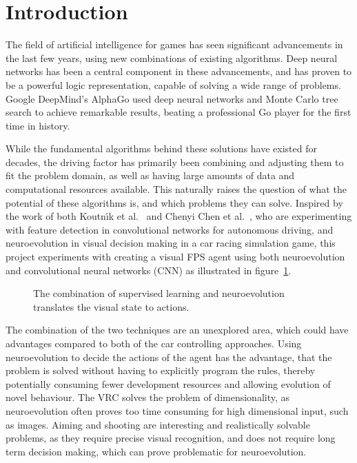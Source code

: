 
\section{Introduction}
The field of artificial intelligence for games has seen significant advancements in the last few years, using new combinations of existing algorithms. Deep neural networks has been a central component in these advancements, and has proven to be a powerful logic representation, capable of solving a wide range of problems. Google DeepMind's AlphaGo\cite{christian} used deep neural networks and Monte Carlo tree search to achieve remarkable results, beating a professional Go player for the first time in history.

While the fundamental algorithms behind these solutions have existed for decades, the driving factor has primarily been combining and adjusting them to fit the problem domain, as well as having large amounts of data and computational resources available. This naturally raises the question of what the potential of these algorithms is, and which problems they can solve. Inspired by the work of both Koutn\'{\i}k et al.~\cite{torcs} and Chenyi Chen et al.~\cite{chen}, who are experimenting with feature detection in convolutional networks for autonomous driving, and neuroevolution in visual decision making in a car racing simulation game, this project experiments with creating a visual FPS agent using both neuroevolution and convolutional neural networks (CNN) as illustrated in figure~\ref{fig:architecture}.

\begin{figure}[H]
	\begin{scriptsize}
		\sffamily
		\def\svgwidth{\textwidth}
		
		\vspace{-45mm}
	\end{scriptsize}
	\caption[Overview of the architecture of the solution]{The combination of supervised learning and neuroevolution translates the visual state to actions.}
	\label{fig:architecture}
\end{figure}

The combination of the two techniques are an unexplored area, which could have advantages compared to both of the car controlling approaches. Using neuroevolution to decide the actions of the agent has the advantage, that the problem is solved without having to explicitly program the rules, thereby potentially consuming fewer development resources and allowing evolution of novel behaviour. The VRC solves the problem of dimensionality, as neuroevolution often proves too time consuming for high dimensional input, such as images. Aiming and shooting are interesting and realistically solvable problems, as they require precise visual recognition, and does not require long term decision making, which can prove problematic for neuroevolution.

